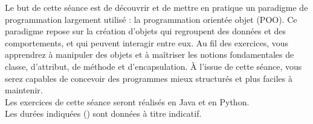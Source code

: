 
\usepackage{amsmath}



\ShowSolutiontrue
\ShowConseiltrue
\titre
{}

Le but de cette séance est de découvrir et de mettre en pratique un paradigme de programmation largement utilisé : la programmation orientée objet (POO). Ce paradigme repose sur la création d'objets qui regroupent des données et des comportements, et qui peuvent interagir entre eux. Au fil des exercices, vous apprendrez à manipuler des objets et à maîtriser les notions fondamentales de classe, d'attribut, de méthode et d'encapsulation. À l'issue de cette séance, vous serez capables de concevoir des programmes mieux structurés et plus faciles à maintenir. \\

Les exercices de cette séance seront réalisés en Java et en Python. \\

Les durées indiquées (\faClock) sont données à titre indicatif.
